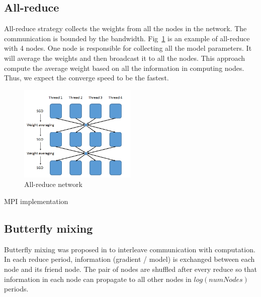 \documentclass{article}
\begin{document}
\subsection{All-reduce}
All-reduce strategy collects the weights from all the nodes in the network. The communication is bounded by 
the bandwidth. Fig~\ref{fig:allreduce} is an example of all-reduce with 4 nodes. One node is responsible for
collecting all the model parameters. It will average the weights and then broadcast it to all the nodes. 
This approach compute the average weight based on all the information in computing nodes. Thus, we expect 
the converge speed to be the fastest.
\begin{figure}[htb]
  \centering
  \includegraphics[width=0.5\textwidth]{allreduce.png}
  \caption{All-reduce network}
  \label{fig:allreduce}
\end{figure}

MPI implementation

\subsection{Butterfly mixing}
Butterfly mixing was proposed in \cite{zhao2013butterfly} to interleave communication with computation. In each
reduce period, information (gradient / model) is exchanged between each node and its friend node. The pair of nodes
are shuffled after every reduce so that information in each node can propagate to all other nodes in $log(numNodes)$ periods.
\end{document}
